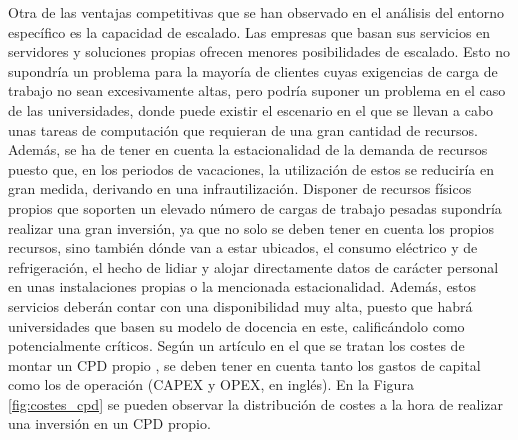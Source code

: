 Otra de las ventajas competitivas que se han observado en el análisis del entorno específico es la capacidad de escalado. Las empresas que basan sus servicios en servidores y soluciones propias ofrecen menores posibilidades de escalado. Esto no supondría un problema para la mayoría de clientes cuyas exigencias de carga de trabajo no sean excesivamente altas, pero podría suponer un problema en el caso de las universidades, donde puede existir el escenario en el que se llevan a cabo unas tareas de computación que requieran de una gran cantidad de recursos. Además, se ha de tener en cuenta la estacionalidad de la demanda de recursos puesto que, en los periodos de vacaciones, la utilización de estos se reduciría en gran medida, derivando en una infrautilización. Disponer de recursos físicos propios que soporten un elevado número de cargas de trabajo pesadas supondría realizar una gran inversión, ya que no solo se deben tener en cuenta los propios recursos, sino también dónde van a estar ubicados, el consumo eléctrico y de refrigeración, el hecho de lidiar y alojar directamente datos de carácter personal en unas instalaciones propias o la mencionada estacionalidad. Además, estos servicios deberán contar con una disponibilidad muy alta, puesto que habrá universidades que basen su modelo de docencia en este, calificándolo como potencialmente críticos. Según un artículo en el que se tratan los costes de montar un \acs{CPD} propio \cite{cristinalopezalbarran}, se deben tener en cuenta tanto los gastos de capital como los de operación (\acf{CAPEX} y \acf{OPEX}, en inglés). En la Figura \ref{fig:costes_cpd} se pueden observar la distribución de costes a la hora de realizar una inversión en un \acs{CPD} propio.

\clearpage


